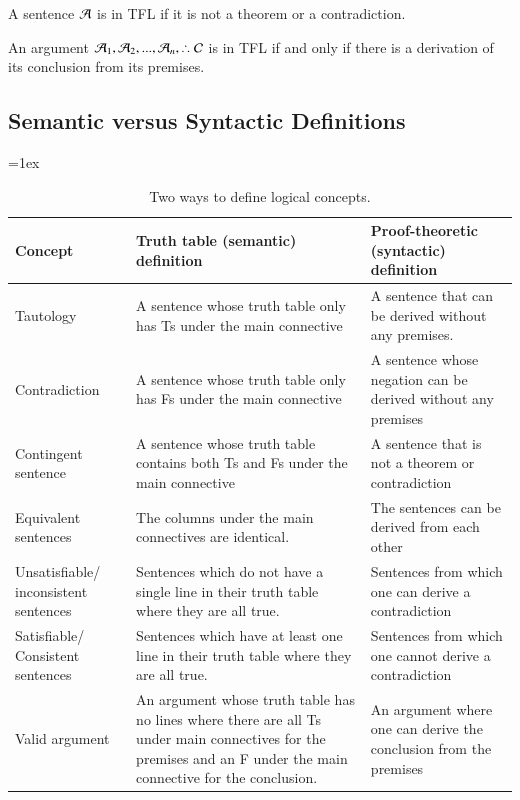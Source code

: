 \documentclass[12pt, a4paper, oneside, openright, titlepage]{book}
\begin{document}
\begin{defn}
    A sentence $\mathcal{A}$ is  in TFL if it is not a theorem or a contradiction.
\end{defn}

\begin{defn}
    An argument $\metav{A}_1,\metav{A}_2,...,\metav{A}_n,\therefore \metav{C}$ is  in TFL if and only if there is a derivation of its conclusion from its premises.
\end{defn}

\subsection{\textsection Semantic versus Syntactic Definitions}

\begin{table}[H]
\tabulinesep=1ex
\begin{tabu}{X[.5,c,m] ||X[1,l,m] |X[1,l,m]}
\textbf{Concept} 		&	\textbf{Truth table (semantic) definition} 	&	\textbf{Proof-theoretic (syntactic) definition} \\ \hline \hline

Tautology   &	A sentence whose truth table only has Ts under the main connective & A sentence that can be derived without any premises.	 \\ \hline
 
Contradiction		&	A sentence whose truth table only has Fs under the main connective  &	A sentence whose negation can be derived without any premises\\ \hline

Contingent sentence	&	A sentence whose truth table contains both Ts and Fs under the main connective & A sentence that is not a theorem or contradiction \\ \hline

Equivalent sentences &	The columns under the main connectives are identical.& The sentences can be derived from each other	\\ \hline

Unsatisfiable/ inconsistent sentences	&	Sentences which do not have a single line in their truth table where they are all true.	& Sentences  from which one can derive a contradiction \\ \hline

Satisfiable/ Consistent sentences	&	Sentences which have at least one line in their truth table where they are all true. & Sentences from which one cannot derive a contradiction	\\ \hline

Valid argument		&	An argument whose truth table has no lines where there are all Ts under main connectives for the premises and an F under the main connective for the conclusion.  & An argument where one can derive the conclusion from the premises	\\ 
\end{tabu}
\caption{Two ways to define logical concepts.}
\label{table:truth_tables_or_derivations}
\end{table}
\end{document}
